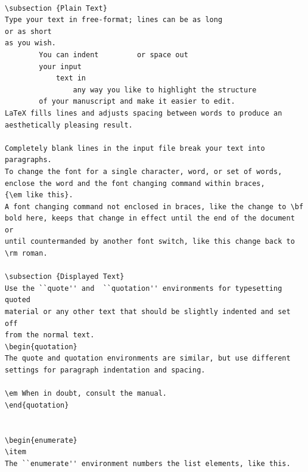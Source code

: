 \documentclass[11pt,oneside]{book}
\begin{document}
\pagebreak
{}
\begin{verbatim}

\subsection {Plain Text}
Type your text in free-format; lines can be as long
or as short
as you wish.
        You can indent         or space out
        your input 
            text in 
                any way you like to highlight the structure
        of your manuscript and make it easier to edit.
LaTeX fills lines and adjusts spacing between words to produce an
aesthetically pleasing result.

Completely blank lines in the input file break your text into
paragraphs.
To change the font for a single character, word, or set of words, 
enclose the word and the font changing command within braces, 
{\em like this}.
A font changing command not enclosed in braces, like the change to \bf 
bold here, keeps that change in effect until the end of the document or
until countermanded by another font switch, like this change back to 
\rm roman.

\subsection {Displayed Text}
Use the ``quote'' and  ``quotation'' environments for typesetting quoted
material or any other text that should be slightly indented and set off
from the normal text.
\begin{quotation}
The quote and quotation environments are similar, but use different 
settings for paragraph indentation and spacing.

\em When in doubt, consult the manual.
\end{quotation}


\begin{enumerate}
\item 
The ``enumerate'' environment numbers the list elements, like this.


\end{verbatim}
\end{document}
